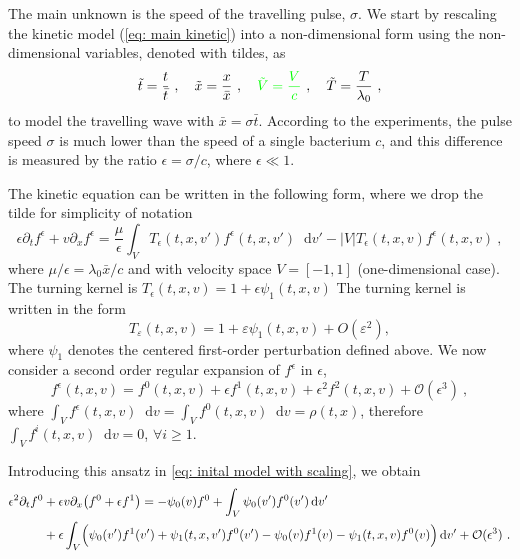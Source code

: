 \documentclass[11pt,twoside]{article}
\numberwithin{equation}{section}
\newcommand*\diff{\mathop{}\!\mathrm{d}}
\theoremstyle{plain}
\theoremstyle{nonumberplain}
\newcommand{\e}{\epsilon}
\begin{document}
The main unknown is the speed of the travelling pulse, $\sigma$. We start by rescaling the kinetic model (\ref{eq: main kinetic}) into a non-dimensional form using the non-dimensional variables, denoted with tildes, as
\begin{equation}
    \tilde{t}= \frac{{t}}{\bar{t}}\ , \quad \tilde{x} = \frac{x}{\bar{x}}\ , \quad {\color{green}\tilde{V} = \frac{V}{c}}\ , \quad \tilde{T}=\frac{T}{\lambda_0}\ ,
    \nonumber
\end{equation}
to model the travelling wave with $\bar{x} = \sigma\bar{t}$. According to the experiments, the pulse
speed $\sigma$ is much lower than the speed of a single bacterium $c$, and this difference is measured by the ratio $\epsilon = \sigma / c$, where $\epsilon \ll 1$.



The kinetic equation can be written in the following form, where we  drop the tilde for simplicity of notation 
{\color{red}
\begin{equation}
    \epsilon \partial_t f^\epsilon+{v}\partial_x f^\epsilon = \frac{\mu}{\epsilon}\int_V T_\epsilon(t,x,v')f^\epsilon(t,x,v')\diff v'-|V|T_\epsilon(t,x,v)f^\epsilon(t,x,v)\ , \label{eq: inital model with scaling}
\end{equation}}
where $\mu/\epsilon=\lambda_0 \bar{x}/c$ and with velocity space \( V = [-1,1] \) (one-dimensional case). {\color{green}The turning kernel is $T_\epsilon(t,x,v)=1+\epsilon \psi_1(t,x,v)$}{\color{red} The turning kernel is written in the form
\[
T_\varepsilon(t,x,v)=1+\varepsilon\psi_1(t,x,v)+O(\varepsilon^2),
\]
where \(\psi_1\) denotes the centered first-order perturbation defined above}.
We now consider a second order regular expansion of $f^\e$ in $\epsilon$, 
\begin{equation*}
f^\e(t,{x},{v})=f^0(t,{x},{v})+\epsilon f^1(t,{x},{v})+\epsilon^2 f^2(t,{x},{v})+\mathcal{O}(\epsilon^3)\ , 
\end{equation*}
where $\int_V f^\e(t,{x},{v})\diff {v} = \int_V f^0(t,{x},{v})\diff {v} = \rho(t,{x})$, therefore $\int_V f^i(t,{x},{v})\diff {v}=0$, $\forall i\geq 1$.






Introducing this ansatz in \eqref{eq: inital model with scaling}, we obtain
\iffalse
{\begin{align*}
    \epsilon^2\partial_t f^0&+\epsilon{v}\partial_x\big(f^0+\epsilon f^1  \big) 
    =-\psi_0(v) f^0+\int_V\psi_0(v')f^0(v')\diff v'\\
    &+\epsilon\int_V\Bigl(\psi_0(v')f^1(v')+\psi_1(t,x,v')f^0(v')-\psi_0(v)f^1(v)-\psi_1(t,x,v)f^0(v) \Bigr)\diff v'+{\mathcal{O}(\epsilon^3)}
      \ .
\end{align*}}
\end{document}
